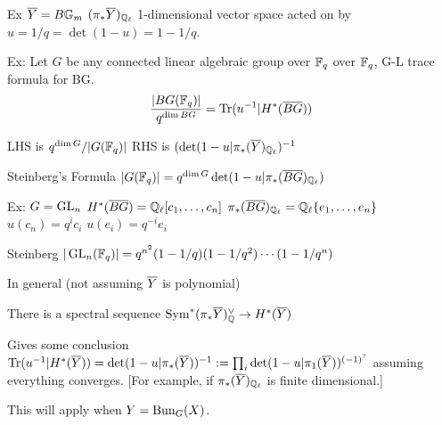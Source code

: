 Ex $\overline{Y}= B\mathbb{G}_m$
$(\pi_* \overline{Y})_{\mathbb{Q}_\ell}$ 1-dimensional vector space
acted on by $u= 1/q= \det(1-u)= 1-1/q$.


Ex: Let $G$ be any connected linear algebraic group over $\mathbb{F}_q$ over $\mathbb{F}_q$, G-L trace formula for BG.
	\[
	\dfrac{|BG(\mathbb{F}_q)|}{q^{\dim BG}} = \operatorname{Tr}(u^{-1} | H^*(\overline{BG}))
	\]

LHS is $q^{\dim G}/|G(\mathbb{F}_q)|$
RHS is $(\det (1-u | \pi_*(\overline{Y})_{\mathbb{Q}_\ell})^{-1}$

Steinberg's Formula 
$|G(\mathbb{F}_q)|= q^{\dim G} \det(1-u | \pi_*(\overline{BG})_{\mathbb{Q}_\ell})$


Ex: $G= \operatorname{GL}_n$
$H^*(\overline{BG})= \mathbb{Q}_\ell[c_1,\ldots,c_n]$
$\pi_*(\overline{BG})_{\mathbb{Q}_\ell}= \mathbb{Q}_\ell\{e_1,\ldots,e_n\}$
$u(c_n)= q^i c_i$
$u(e_i)= q^{-i} e_i$

Steinberg
$|\operatorname{GL}_n(\mathbb{F}_q)|= q^{n^2} (1-1/q)(1-1/q^2)\cdots(1-1/q^n)$


In general (not assuming $\overline{Y}$ is polynomial)

There is a spectral sequence $\operatorname{Sym}^*(\pi_* \overline{Y})_{\mathbb{Q}}^\vee \to H^*(\overline{Y})$

Gives some conclusion
$\operatorname{Tr}(u^{-1}|H^*(\overline{Y}))= \det(1-u| \pi_*(\overline{Y}))^{-1}:= \prod_i \det(1-u | \pi_1(\overline{Y}))^{(-1)^?}$ assuming everything converges. [For example, if $\pi_*(\overline{Y})_{\mathbb{Q}_\ell}$ is finite dimensional.] 




This will apply when $Y= \operatorname{Bun}_G(X)$. 




















